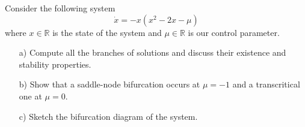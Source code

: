 \begin{problem}
  Consider the following system
  \[
  \dot{x} = -x \left( x^2 - 2x - \mu \right)
  \]
  where $x \in \mathbb{R}$ is the state of the system and $\mu \in \mathbb{R}$ is our control parameter.

  \bigskip

  \begin{enumerate}
  \item[a)] Compute all the branches of solutions and discuss their existence and stability properties.
  \item[b)] Show that a saddle-node bifurcation occurs at $\mu = -1$ and a transcritical one at $\mu = 0$.
  \item[c)] Sketch the bifurcation diagram of the system.
  \end{enumerate}
\end{problem}

\bigskip

